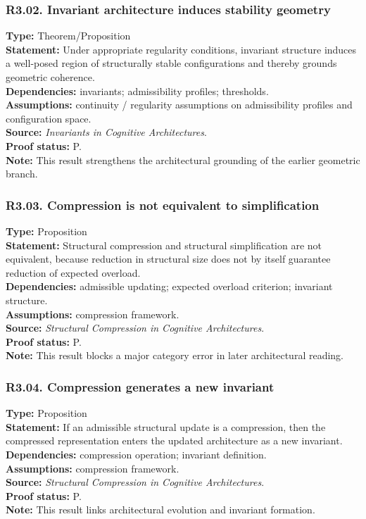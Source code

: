 \documentclass[12pt]{article}
\begin{document}
	\subsubsection*{R3.02. Invariant architecture induces stability geometry}
	\textbf{Type:} Theorem/Proposition \\
	\textbf{Statement:} Under appropriate regularity conditions, invariant structure induces a
	well-posed region of structurally stable configurations and thereby grounds geometric coherence. \\
	\textbf{Dependencies:} invariants; admissibility profiles; thresholds. \\
	\textbf{Assumptions:} continuity / regularity assumptions on admissibility profiles and
	configuration space. \\
	\textbf{Source:} \emph{Invariants in Cognitive Architectures}. \\
	\textbf{Proof status:} P. \\
	\textbf{Note:} This result strengthens the architectural grounding of the earlier geometric branch.
	
	\subsubsection*{R3.03. Compression is not equivalent to simplification}
	\textbf{Type:} Proposition \\
	\textbf{Statement:} Structural compression and structural simplification are not equivalent,
	because reduction in structural size does not by itself guarantee reduction of expected overload. \\
	\textbf{Dependencies:} admissible updating; expected overload criterion; invariant structure. \\
	\textbf{Assumptions:} compression framework. \\
	\textbf{Source:} \emph{Structural Compression in Cognitive Architectures}. \\
	\textbf{Proof status:} P. \\
	\textbf{Note:} This result blocks a major category error in later architectural reading.
	
	\subsubsection*{R3.04. Compression generates a new invariant}
	\textbf{Type:} Proposition \\
	\textbf{Statement:} If an admissible structural update is a compression, then the compressed
	representation enters the updated architecture as a new invariant. \\
	\textbf{Dependencies:} compression operation; invariant definition. \\
	\textbf{Assumptions:} compression framework. \\
	\textbf{Source:} \emph{Structural Compression in Cognitive Architectures}. \\
	\textbf{Proof status:} P. \\
	\textbf{Note:} This result links architectural evolution and invariant formation.
	
\end{document}
